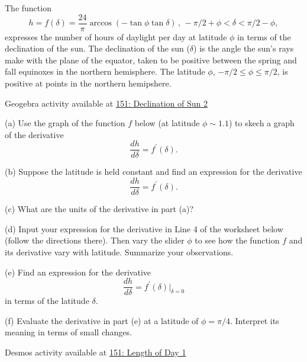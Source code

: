\documentclass{ximera}
\begin{document}
\begin{question}  \label{Q:er43455}
The function
\[
    h = f(\delta) = \frac{24}{\pi} \arccos(-\tan\phi \tan\delta) \, , \, -\pi/2+\phi < \delta < \pi/2-\phi ,
\]
expresses the number of hours of daylight per day at latitude $\phi$ in terms of the declination of the sun. The declination of the sun ($\delta$) is the angle the sun's rays make with the plane of the equator, taken to be positive between the spring and fall equinoxes in the northern hemisphere. The latitude $\phi$, $-\pi/2 \leq \phi \leq \pi/2$, is positive at points in the northern hemipshere.

\begin{onlineOnly}
    \begin{center}
\end{center}
\end{onlineOnly}

Geogebra activity available at \href{https://www.geogebra.org/classic/vnhrutwu}{151: Declination of Sun 2}


(a) Use the graph of the function $f$ below (at latitude $\phi \sim 1.1$) to skech a graph of the derivative
\[
   \frac{dh}{d\delta} = f^\prime(\delta) .
\]

(b) Suppose the latitude is held constant and find an expression for the derivative 
\[
   \frac{dh}{d\delta} = f^\prime(\delta) .
\]

(c) What are the units of the derivative in part (a)?

(d) Input your expression for the derivative in Line 4 of the worksheet below (follow the directions there). Then vary the slider $\phi$ to see how the function $f$ and its derivative vary with latitude. Summarize your observations.

(e) Find an expression for the derivative 
\[
   \frac{dh}{d\delta} = f^\prime(\delta) \Big|_{\delta = 0}
\]
in terms of the latitude $\delta$. 

(f) Evaluate the derivative in part (e) at a latitude of $\phi =\pi/4$. Interpret its meaning in terms of small changes.

\begin{onlineOnly}
    \begin{center}
\end{center}
\end{onlineOnly}

Desmos activity available at \href{https://www.desmos.com/calculator/ifomatkcta}{151: Length of Day 1}


\end{question}
\end{document}

